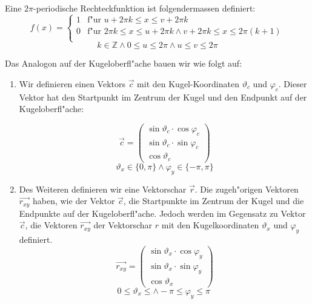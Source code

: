 \begin{refsection}
Eine $2\pi$-periodische Rechteckfunktion ist folgendermassen definiert:
\begin{equation}
f(x) =
\begin{cases}
1 & \text{f"ur } u+2\pi k \leq x \leq v + 2\pi k\\
0 & \text{f"ur } 2\pi k \leq x \leq u + 2\pi k \wedge v + 2\pi k \leq x \leq 2\pi (k+1) \\
\end{cases}
\label{skript:Rechteckfunktion Formel}
\end{equation}
$$
k \in \mathbb Z \wedge 0 \leq u \leq 2\pi \wedge u \leq v \leq 2\pi
$$


Das Analogon auf der Kugeloberfl"ache bauen wir wie folgt auf:
\begin{enumerate}
\item Wir definieren einen Vektors $\vec{c}$ mit den Kugel-Koordinaten
$\vartheta_c$ und $\varphi_c$.
Dieser Vektor hat den Startpunkt im Zentrum der Kugel und den Endpunkt 
auf der Kugeloberfl"ache:

\begin{equation}
\vec{c} = 
\begin{pmatrix}
{\sin\vartheta_c \cdot \cos\varphi_c}\\
{\sin\vartheta_c \cdot \sin\varphi_c}\\
{\cos\vartheta_c}
\end{pmatrix}
\label{skript:Vektor c Formel}
\end{equation}
$$
\vartheta_x \in \{0, \pi\} \wedge \varphi_y \in \{-\pi, \pi\}
$$

\item Des Weiteren definieren wir eine Vektorschar $\vec{r}$.
Die zugeh"origen Vektoren $\overrightarrow{r_{xy}}$ haben, wie der 
Vektor $\vec{c}$, die Startpunkte im Zentrum der Kugel und die 
Endpunkte auf der Kugeloberfl"ache. 
Jedoch werden im Gegensatz zu Vektor $\vec{c}$, die Vektoren  
$\overrightarrow{r_{xy}}$ der Vektorschar $r$ mit den Kugelkoordinaten
$\vartheta_x$ und $\varphi_y$ definiert.
\[
\overrightarrow{r_{xy}} = 
\begin{pmatrix}
{\sin\vartheta_x \cdot \cos\varphi_y}\\
{\sin\vartheta_x \cdot \sin\varphi_y}\\
{\cos\vartheta_x}
\end{pmatrix}
\]
$$
0 \leq \vartheta_x \leq \wedge -\pi \leq \varphi_y \leq \pi\
$$


\end{enumerate}
\end{refsection}
